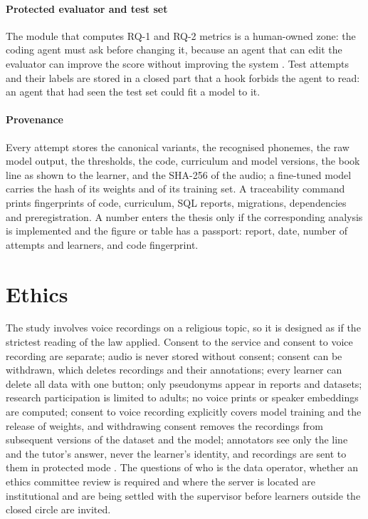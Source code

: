 \paragraph{Protected evaluator and test set} The module that computes RQ-1 and RQ-2 metrics is a human-owned
zone: the coding agent must ask before changing it, because an agent that can edit the evaluator can
improve the score without improving the system \cite{SRC-027,SRC-082}. Test attempts and their labels are
stored in a closed part that a hook forbids the agent to read: an agent that had seen the test set could fit a model to it.

\paragraph{Provenance} Every attempt stores the canonical variants, the recognised phonemes, the raw model
output, the thresholds, the code, curriculum and model versions, the book line as shown to the learner, and
the SHA-256 of the audio; a fine-tuned model carries the hash of its weights and of its training set. A
traceability command prints fingerprints of code, curriculum, SQL reports,
migrations, dependencies and preregistration. A number enters the thesis only if the corresponding analysis
is implemented and the figure or table has a passport: report, date, number of attempts and learners, and
code fingerprint.

\section{Ethics}\label{sec:method-ethics}

The study involves voice recordings on a religious topic, so it is designed as if the strictest reading of
the law applied. Consent to the service and consent to voice recording are separate; audio is never stored
without consent; consent can be withdrawn, which deletes recordings and their annotations; every learner can
delete all data with one button; only pseudonyms appear in reports and datasets; research participation is
limited to adults; no voice prints or speaker embeddings are computed; consent to voice recording
explicitly covers model training and the release of weights, and withdrawing consent removes the
recordings from subsequent versions of the dataset and the model; annotators see only the line and the
tutor's answer, never the learner's identity, and recordings are sent to them in protected mode
\cite{SRC-033,SRC-036,SRC-037}. The questions of who is the data operator, whether an ethics committee review
is required and where the server is located are institutional and are being settled with the supervisor
before learners outside the closed circle are invited.

